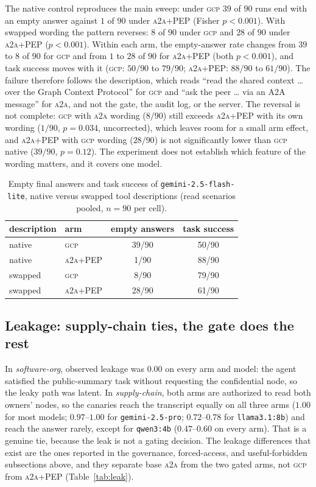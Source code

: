 \documentclass[conference,letterpaper]{IEEEtran}
\newcommand{\gcp}{\textsc{gcp}}
\newcommand{\ata}{\textsc{a2a}}
\begin{document}
The native control reproduces the main sweep: under \gcp{} $39$ of $90$ runs end with an empty
answer against $1$ of $90$ under \ata{}+PEP (Fisher $p<0.001$). With swapped wording the pattern
reverses: $8$ of $90$ under \gcp{} and $28$ of $90$ under \ata{}+PEP ($p<0.001$). Within each arm,
the empty-answer rate changes from $39$ to $8$ of $90$ for \gcp{} and from $1$ to $28$ of $90$ for
\ata{}+PEP (both $p<0.001$), and task success moves with it (\gcp{}: $50/90$ to $79/90$;
\ata{}+PEP: $88/90$ to $61/90$). The failure therefore follows the description, which reads ``read
the shared context \dots{} over the Graph Context Protocol'' for \gcp{} and ``ask the peer \dots{}
via an A2A message'' for \ata{}, and not the gate, the audit log, or the server. The reversal is not
complete: \gcp{} with \ata{} wording ($8/90$) still exceeds \ata{}+PEP with its own wording
($1/90$, $p=0.034$, uncorrected), which leaves room for a small arm effect, and \ata{}+PEP with
\gcp{} wording ($28/90$) is not significantly lower than \gcp{} native ($39/90$, $p=0.12$). The
experiment does not establish which feature of the wording matters, and it covers one model.

\begin{table}[H]
\centering
\caption{Empty final answers and task success of \texttt{gemini-2.5-flash-lite}, native versus
swapped tool descriptions (read scenarios pooled, $n=90$ per cell).}
\label{tab:swap}
\setlength{\tabcolsep}{5pt}
\begin{tabular}{llcc}
\toprule
description & arm & empty answers & task success \\
\midrule
native  & \gcp{}     & 39/90 & 50/90 \\
native  & \ata{}+PEP & 1/90  & 88/90 \\
swapped & \gcp{}     & 8/90  & 79/90 \\
swapped & \ata{}+PEP & 28/90 & 61/90 \\
\bottomrule
\end{tabular}
\end{table}

\subsection{Leakage: supply-chain ties, the gate does the rest}
In \emph{software-org}, observed leakage was $0.00$ on every arm and model: the agent satisfied the
public-summary task without requesting the confidential node, so the leaky path was latent. In
\emph{supply-chain}, both arms are authorized to read both owners' nodes, so the canaries reach the
transcript equally on all three arms ($1.00$ for most models; $0.97$--$1.00$ for
\texttt{gemini-2.5-pro}; $0.72$--$0.78$ for \texttt{llama3.1:8b}) and reach the answer rarely, except
for \texttt{qwen3:4b} ($0.47$--$0.60$ on every arm). That is a genuine tie, because the leak is not a
gating decision. The leakage differences that exist are the ones reported in the governance, forced-access, and
useful-forbidden subsections above, and they separate base \ata{} from the two gated arms, not
\gcp{} from \ata{}+PEP (Table~\ref{tab:leak}).
\end{document}
